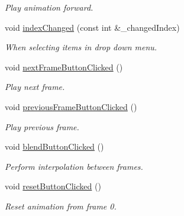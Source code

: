 \begin{DoxyCompactItemize}
\begin{DoxyCompactList}\small\item\em Play animation forward. \end{DoxyCompactList}\item 
void \hyperlink{class_main_window_a85e8fae2ffce17fef461ada157363a53}{index\+Changed} (const int \&\+\_\+changed\+Index)
\begin{DoxyCompactList}\small\item\em When selecting items in drop down menu. \end{DoxyCompactList}\item 
void \hyperlink{class_main_window_aeaecda5b7b440cacb44af5a5e0cb0d31}{next\+Frame\+Button\+Clicked} ()\hypertarget{class_main_window_aeaecda5b7b440cacb44af5a5e0cb0d31}{}\label{class_main_window_aeaecda5b7b440cacb44af5a5e0cb0d31}

\begin{DoxyCompactList}\small\item\em Play next frame. \end{DoxyCompactList}\item 
void \hyperlink{class_main_window_ab9c00fd6342fa410a21d8b0890ec8bc6}{previous\+Frame\+Button\+Clicked} ()\hypertarget{class_main_window_ab9c00fd6342fa410a21d8b0890ec8bc6}{}\label{class_main_window_ab9c00fd6342fa410a21d8b0890ec8bc6}

\begin{DoxyCompactList}\small\item\em Play previous frame. \end{DoxyCompactList}\item 
void \hyperlink{class_main_window_adb3db960aa6a81f81104b47fcbc6e2cb}{blend\+Button\+Clicked} ()\hypertarget{class_main_window_adb3db960aa6a81f81104b47fcbc6e2cb}{}\label{class_main_window_adb3db960aa6a81f81104b47fcbc6e2cb}

\begin{DoxyCompactList}\small\item\em Perform interpolation between frames. \end{DoxyCompactList}\item 
void \hyperlink{class_main_window_a063d9c04346924e609d6b6ad833e3caa}{reset\+Button\+Clicked} ()\hypertarget{class_main_window_a063d9c04346924e609d6b6ad833e3caa}{}\label{class_main_window_a063d9c04346924e609d6b6ad833e3caa}

\begin{DoxyCompactList}\small\item\em Reset animation from frame 0. \end{DoxyCompactList}\end{DoxyCompactItemize}
